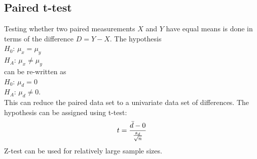 \subsection{Paired t-test}

Testing whether two paired measurements $X$ and $Y$ have equal means is done in terms of the difference $D=Y-X$. The hypothesis \\
$H_0$: $\mu_x = \mu_y$ \\
$H_A$: $\mu_x\neq \mu_y$ \\
can be re-written as \\
$H_0$: $\mu_d=0$ \\
$H_A$: $\mu_d\neq 0$. \\
This can reduce the paired data set to a univariate data set of differences. The hypothesis can be assigned using t-test:
\begin{align}
	t = \frac{\bar{d}-0}{\frac{s_d}{\sqrt{n}}} \notag
\end{align}
Z-test can be used for relatively large sample sizes.

